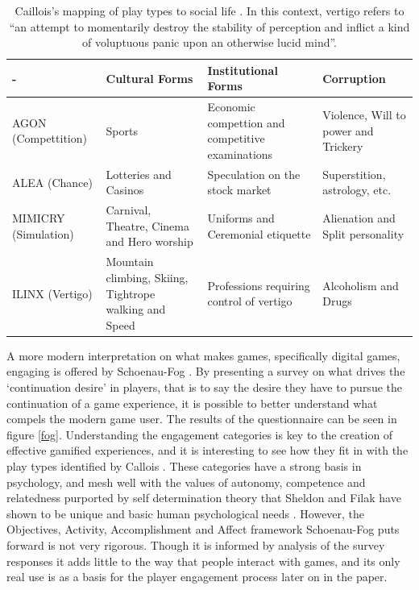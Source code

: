 \documentclass[12pt,a4paper,twoside]{report}
\begin{document}
\begin{table}
	\begin{center}
	\begin{tabular}{|p{2.0cm}|p{4.2cm}|p{4.2cm}|p{4.2cm}|}
		\hline - & Cultural Forms & Institutional Forms & Corruption \\ 
		\hline AGON (Compettition) & Sports & Economic compettion and competitive examinations & Violence, Will to power and Trickery \\ 
		\hline ALEA (Chance) & Lotteries and Casinos & Speculation on the stock market & Superstition, astrology, etc. \\ 
		\hline MIMICRY (Simulation) & Carnival, Theatre, Cinema and Hero worship & Uniforms and Ceremonial etiquette & Alienation and Split personality \\ 
		\hline ILINX (Vertigo) & Mountain climbing, Skiing, Tightrope walking and Speed & Professions requiring control of vertigo & Alcoholism and Drugs \\ 
		\hline 
	\end{tabular}
	\end{center}
	\caption{Caillois's mapping of play types to social life \cite{caillois1961man}. In this context, vertigo refers to ``an attempt to momentarily destroy the stability of perception and inflict a kind of voluptuous panic upon an otherwise lucid mind''.}
	\label{table:corruption}
\end{table}

A more modern interpretation on what makes games, specifically digital games, engaging is offered by Schoenau-Fog \cite{schoenau2011player}. By presenting a survey on what drives the `continuation desire' in players, that is to say the desire they have to pursue the continuation of a game experience, it is possible to better understand what compels the modern game user. The results of the questionnaire can be seen in figure \ref{fog}. Understanding the engagement categories is key to the creation of effective gamified experiences, and it is interesting to see how they fit in with the play types identified by Callois \cite{caillois1961man}. These categories have a strong basis in psychology, and mesh well with the values of autonomy, competence and relatedness purported by self determination theory that Sheldon and Filak have shown to be unique and basic human psychological needs \cite{sheldon2008manipulating}. However, the Objectives, Activity, Accomplishment and Affect framework Schoenau-Fog puts forward is not very rigorous. Though it is informed by analysis of the survey responses it adds little to the way that people interact with games, and its only real use is as a basis for the player engagement process later on in the paper.
\end{document}
